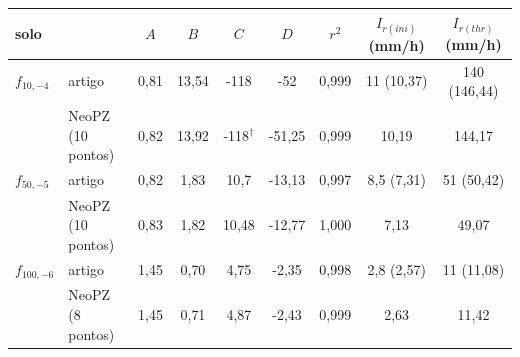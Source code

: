 \begin{tabular}{ll|cccc|c|cc}
\toprule
solo & & $A$ & $B$ & $C$ & $D$ & $r^2$ & $I_{r(ini)}$ (mm/h) & $I_{r(thr)}$ (mm/h)\\
\midrule
$f_{10,-4}$ & artigo & 0{,}81 & 13{,}54 & -118 & -52 & 0{,}999 & 11 (10{,}37) & 140 (146{,}44)\\
 & NeoPZ (10 pontos) & 0{,}82 & 13{,}92 & -118$^\dagger$ & -51{,}25 & 0{,}999 & 10{,}19 & 144{,}17\\
\midrule
$f_{50,-5}$ & artigo & 0{,}82 & 1{,}83 & 10{,}7 & -13{,}13 & 0{,}997 & 8{,}5 (7{,}31) & 51 (50{,}42)\\
 & NeoPZ (10 pontos) & 0{,}83 & 1{,}82 & 10{,}48 & -12{,}77 & 1{,}000 & 7{,}13 & 49{,}07\\
\midrule
$f_{100,-6}$ & artigo & 1{,}45 & 0{,}70 & 4{,}75 & -2{,}35 & 0{,}998 & 2{,}8 (2{,}57) & 11 (11{,}08)\\
 & NeoPZ (8 pontos) & 1{,}45 & 0{,}71 & 4{,}87 & -2{,}43 & 0{,}999 & 2{,}63 & 11{,}42\\
\bottomrule
\end{tabular}
